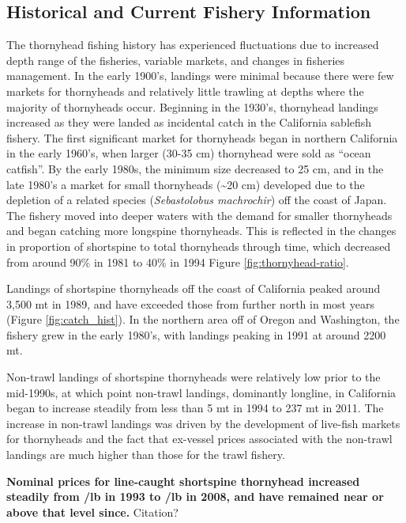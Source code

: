 \documentclass[11pt,
  english,
  letterpaper,
]{article}
\begin{document}
\hypertarget{historical-and-current-fishery-information}{%
\subsection{Historical and Current Fishery Information}\label{historical-and-current-fishery-information}}

The thornyhead fishing history has experienced fluctuations due to increased depth range of the fisheries, variable markets, and changes in fisheries management. In the early 1900's, landings were minimal because there were few markets for thornyheads and relatively little trawling at depths where the majority of thornyheads occur. Beginning in the 1930's, thornyhead landings increased as they were landed as incidental catch in the California sablefish fishery. The first significant market for thornyheads began in northern California in the early 1960's, when larger (30-35 cm) thornyhead were sold as ``ocean catfish''. By the early 1980s, the minimum size decreased to 25 cm, and in the late 1980's a market for small thornyheads (\textasciitilde20 cm) developed due to the depletion of a related species (\emph{Sebastolobus machrochir}) off the coast of Japan. The fishery moved into deeper waters with the demand for smaller thornyheads and began catching more longspine thornyheads. This is reflected in the changes in proportion of shortspine to total thornyheads through time, which decreased from around 90\% in 1981 to 40\% in 1994 Figure \ref{fig:thornyhead-ratio}.

Landings of shortspine thornyheads off the coast of California peaked around 3,500 mt in 1989, and have exceeded those from further north in most years (Figure \ref{fig:catch_hist}). In the northern area off of Oregon and Washington, the fishery grew in the early 1980's, with landings peaking in 1991 at around 2200 mt.

Non-trawl landings of shortspine thornyheads were relatively low prior to the mid-1990s, at which point non-trawl landings, dominantly longline, in California began to increase steadily from less than 5 mt in 1994 to 237 mt in 2011. The increase in non-trawl landings was driven by the development of live-fish markets for thornyheads and the fact that ex-vessel prices associated with the non-trawl landings are much higher than those for the trawl fishery.

\textbf{Nominal prices for line-caught shortspine thornyhead increased steadily from /lb in 1993 to /lb in 2008, and have remained near or above that level since.} Citation?
\end{document}
